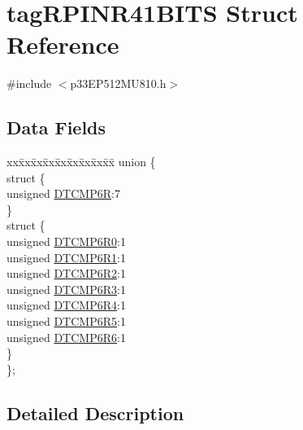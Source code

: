 \hypertarget{structtag_r_p_i_n_r41_b_i_t_s}{}\section{tag\+R\+P\+I\+N\+R41\+B\+I\+TS Struct Reference}
\label{structtag_r_p_i_n_r41_b_i_t_s}


{\ttfamily \#include $<$p33\+E\+P512\+M\+U810.\+h$>$}

\subsection*{Data Fields}
\begin{DoxyCompactItemize}
\item 
\begin{tabbing}
xx\=xx\=xx\=xx\=xx\=xx\=xx\=xx\=xx\=\kill
union \{\\
\>struct \{\\
\>\>unsigned \hyperlink{structtag_r_p_i_n_r41_b_i_t_s_a8a3388ed15965231e0dc34a1b605f367}{DTCMP6R}:7\\
\>\} \\
\>struct \{\\
\>\>unsigned \hyperlink{structtag_r_p_i_n_r41_b_i_t_s_a50ec14d8518f6273269b498a1cab13e2}{DTCMP6R0}:1\\
\>\>unsigned \hyperlink{structtag_r_p_i_n_r41_b_i_t_s_ae067e37d33713a22836e3dc6ff9a4846}{DTCMP6R1}:1\\
\>\>unsigned \hyperlink{structtag_r_p_i_n_r41_b_i_t_s_a06141e541d31dc0c8680b1c7f990a7c0}{DTCMP6R2}:1\\
\>\>unsigned \hyperlink{structtag_r_p_i_n_r41_b_i_t_s_a545e7452fe00871aadaea077d8498c3e}{DTCMP6R3}:1\\
\>\>unsigned \hyperlink{structtag_r_p_i_n_r41_b_i_t_s_aaea198d49be9a54a36133b9d205cb991}{DTCMP6R4}:1\\
\>\>unsigned \hyperlink{structtag_r_p_i_n_r41_b_i_t_s_a21e07052c30d06a9a58decbc0e64e416}{DTCMP6R5}:1\\
\>\>unsigned \hyperlink{structtag_r_p_i_n_r41_b_i_t_s_a3238cc03cbeb2f14151cd2be6e2f8b7c}{DTCMP6R6}:1\\
\>\} \\
\}; \\

\end{tabbing}\end{DoxyCompactItemize}


\subsection{Detailed Description}


